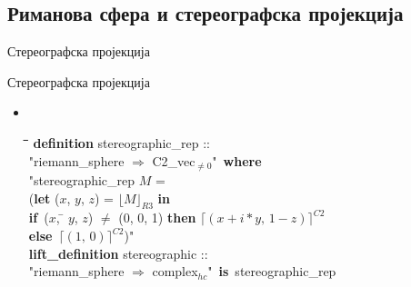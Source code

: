 \documentclass[slidestop, compress, mathserif, containsverbatim, xcolor=dvipsnames]{beamer}
\newcommand{\Absnzv}[1]{\ensuremath{\lceil#1\rceil^{C2}}}
\newcommand{\Reprs}[1]{\ensuremath{\lfloor#1\rfloor_{R3}}}
\begin{document}
\subsection*{Риманова сфера и стереографска пројекција}

\begin{frame}{Стереографска пројекција}
  \begin{center}
    
  \end{center}
\end{frame}


\begin{frame}{Стереографска пројекција}
  \begin{itemize}
  \item \begin{footnotesize} {\tt
    \begin{tabbing}
      \hspace{4mm}\=\hspace{4mm}\=\hspace{4mm}\=\hspace{4mm}\=\hspace{4mm}\=\kill
      {\bf definition} stereographic\_rep :: \\
      \> "{}riemann\_sphere $\Rightarrow$ C2\_vec$_{\neq 0}$"\ {\bf where} \\
      \> "{}stereographic\_rep $M$ = \\
    \>\> ({\bf l}\={\bf et} ($x$, $y$, $z$) = $\Reprs{M}$ {\bf in}\\
    \>\>\>  {\bf if}\ ($x$, \= $y$, $z$) $\neq$ (0, 0, 1) {\bf then} $\Absnzv{(x + i * y,\, 1 - z)}$ \\
    \>\>\>  {\bf else}\ $\Absnzv{(1,\,0)}$)"\\
      {\bf lift\_definition} stereographic :: \\
      \> "{}riemann\_sphere $\Rightarrow$ complex$_{hc}$"\ {\bf is}\ stereographic\_rep
    \end{tabbing} 
  } \end{footnotesize} \vfill
  \end{itemize}
\end{frame}
\end{document}
